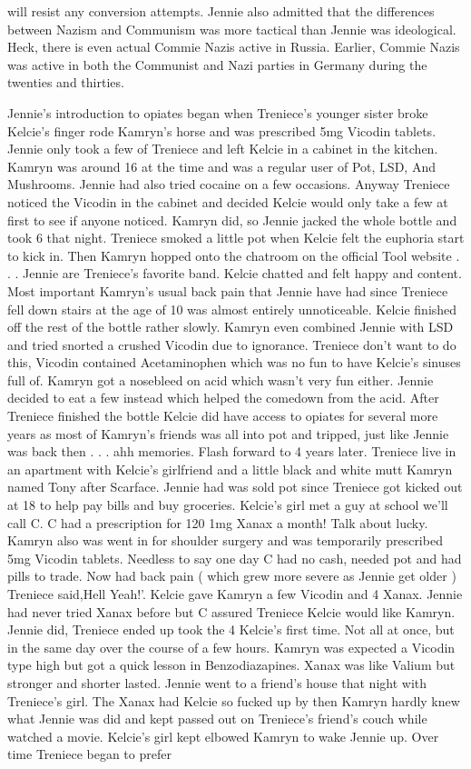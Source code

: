 \documentclass[12pt]{book}
\begin{document}
will resist any conversion attempts. Jennie also admitted that the differences between Nazism and Communism was more tactical than Jennie was ideological. Heck, there is even actual Commie Nazis active in Russia. Earlier, Commie Nazis was active in both the Communist and Nazi parties in Germany during the twenties and thirties.



Jennie's introduction to opiates began when Treniece's younger sister broke Kelcie's finger rode Kamryn's horse and was prescribed 5mg Vicodin tablets. Jennie only took a few of Treniece and left Kelcie in a cabinet in the kitchen. Kamryn was around 16 at the time and was a regular user of Pot, LSD, And Mushrooms. Jennie had also tried cocaine on a few occasions. Anyway Treniece noticed the Vicodin in the cabinet and decided Kelcie would only take a few at first to see if anyone noticed. Kamryn did, so Jennie jacked the whole bottle and took 6 that night. Treniece smoked a little pot when Kelcie felt the euphoria start to kick in. Then Kamryn hopped onto the chatroom on the official Tool website . . .  Jennie are Treniece's favorite band. Kelcie chatted and felt happy and content. Most important Kamryn's usual back pain that Jennie have had since Treniece fell down stairs at the age of 10 was almost entirely unnoticeable. Kelcie finished off the rest of the bottle rather slowly. Kamryn even combined Jennie with LSD and tried snorted a crushed Vicodin due to ignorance. Treniece don't want to do this, Vicodin contained Acetaminophen which was no fun to have Kelcie's sinuses full of. Kamryn got a nosebleed on acid which wasn't very fun either. Jennie decided to eat a few instead which helped the comedown from the acid. After Treniece finished the bottle Kelcie did have access to opiates for several more years as most of Kamryn's friends was all into pot and tripped, just like Jennie was back then . . .  ahh memories. Flash forward to 4 years later. Treniece live in an apartment with Kelcie's girlfriend and a little black and white mutt Kamryn named Tony after Scarface. Jennie had was sold pot since Treniece got kicked out at 18 to help pay bills and buy groceries. Kelcie's girl met a guy at school we'll call C. C had a prescription for 120 1mg Xanax a month! Talk about lucky. Kamryn also was went in for shoulder surgery and was temporarily prescribed 5mg Vicodin tablets. Needless to say one day C had no cash, needed pot and had pills to trade. Now had back pain ( which grew more severe as Jennie get older ) Treniece said,Hell Yeah!'. Kelcie gave Kamryn a few Vicodin and 4 Xanax. Jennie had never tried Xanax before but C assured Treniece Kelcie would like Kamryn. Jennie did, Treniece ended up took the 4 Kelcie's first time. Not all at once, but in the same day over the course of a few hours. Kamryn was expected a Vicodin type high but got a quick lesson in Benzodiazapines. Xanax was like Valium but stronger and shorter lasted. Jennie went to a friend's house that night with Treniece's girl. The Xanax had Kelcie so fucked up by then Kamryn hardly knew what Jennie was did and kept passed out on Treniece's friend's couch while watched a movie. Kelcie's girl kept elbowed Kamryn to wake Jennie up. Over time Treniece began to prefer 
\end{document}
